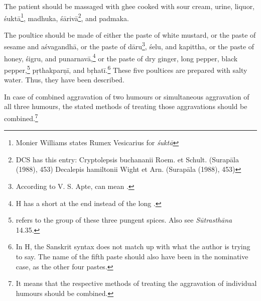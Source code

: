\begin{translation}
\begin{tt}
        The patient should be
        massaged with ghee cooked
        with sour cream, urine, liquor,
        \gls{śuktā}\footnote{Monier
            Williams states Rumex
            Vesicarius for \textit{śuktā}},
        \gls{madhuka},
        \gls{śārivā}\footnote{DCS
            has this entry: Cryptolepsis
            buchananii Roem. et Schult.
            (Surapāla (1988), 453)
            Decalepis hamiltonii Wight et
            Arn. (Surapāla (1988), 453)},
        and \gls{padmaka}.

        The poultice should be
        made of either the paste
        of white mustard, or the
        paste of sesame and
        \gls{aśvagandhā}, or
        the paste of
        \gls{dāru}\footnote{According
            to V. S. Apte,
             can mean
            .},
        \gls{śelu}, and
        \gls{kapittha}, or the
        paste of honey,
        \gls{śigru}, and
        \gls{punarnavā},\footnote{H
            has a short  at
            the end instead of the
            long .} or the
        paste of dry ginger, long
        pepper, black
        pepper,\footnote{
            refers to the group of
            these three pungent
            spices. Also see
            \textit{Sūtrasthāna}
            14.35.}
        \gls{pṛthakparṇī}, and
        \gls{bṛhatī}.\footnote{In
            H, the Sanskrit syntax
            does not match up with
            what the author is trying
            to say. The name of the
            fifth paste should also
            have been in the
            nominative case, as the
            other four
            pastes.} These five
        poultices are prepared
        with salty water. Thus,
        they have been
        described.

        \item[11]
        In case of
        combined
        aggravation of
        two humours
        or
        simultaneous
        aggravation of
        all three
        humours, the
        stated
        methods of
        treating those
        aggravations
        should be
        combined.\footnote{It
            means that
            the respective
            methods of
            treating the
            aggravation of
            individual
            humours
            should be
            combined.}


\end{tt}
\end{translation}
